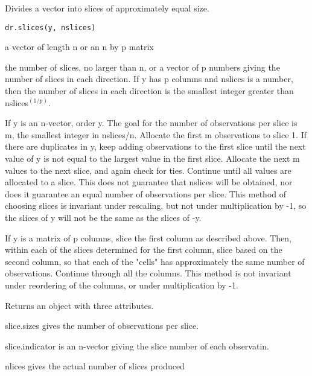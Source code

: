 \begin{Description}\relax
Divides a vector into slices of approximately equal size.\end{Description}
\begin{Usage}
\begin{verbatim}
dr.slices(y, nslices)
\end{verbatim}
\end{Usage}
\begin{Arguments}
\begin{ldescription}
\item[\code{y}] a vector of length n or an n by p matrix
\item[\code{nslices}] the number of slices, no larger than n, or a vector of
p numbers giving the number of slices in each direction.  If y has p 
columns and nslices is a number, then the number of slices in each direction
is the smallest integer greater than nslices$^(1/p)$.
\end{ldescription}
\end{Arguments}
\begin{Details}\relax
If y is an n-vector, order y.  The goal for the number of observations per slice
is m, the smallest integer in nslices/n. Allocate the first m observations to
slice 1.  If there are duplicates in y, keep adding observations to the first
slice until the next value of y is not equal to the largest value in the 
first slice.  Allocate the next m values to the next slice, and again check 
for ties.  Continue until all values are allocated to a slice.  This does not
guarantee that nslices will be obtained, nor does it guarantee an equal number
of observations per slice.  This method of choosing slices is invariant under
rescaling, but not under multiplication by -1, so the slices of y will not
be the same as the slices of -y.

If y is a matrix of p columns, slice the first column as described above.  Then,
within each of the slices determined for the first column, slice based on the
second column, so that each of the "cells" has approximately the same number
of observations.  Continue through all the columns.  This method is not
invariant under reordering of the columns, or under multiplication by -1.\end{Details}
\begin{Value}
Returns an object with three attributes.  
 \item[slice.sizes] gives the number
of observations per slice.  
 \item[slice.indicator] is an n-vector giving the
slice number of each observatin.  
	\item[nlices] gives the actual number of slices produced
\end{Value}

